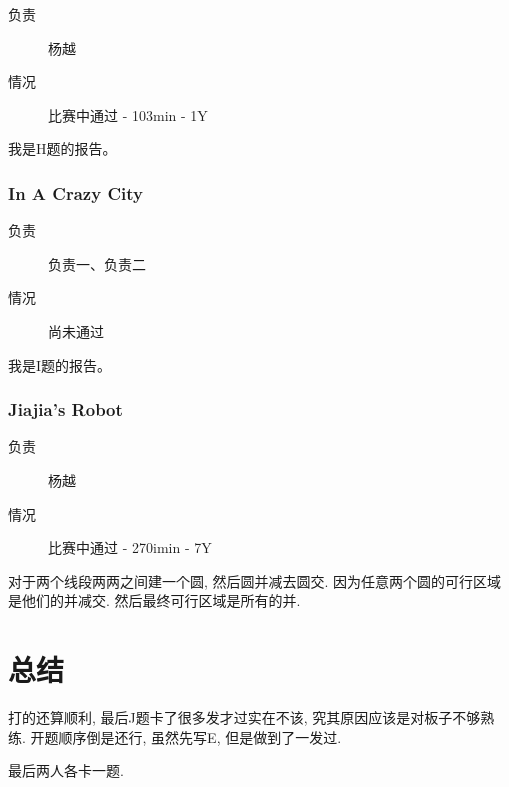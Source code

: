 \documentclass[a4paper, 11pt, nofonts, nocap, fancyhdr]{ctexart}
\newcommand{\problem}[1]{\subsubsection{#1}}
\begin{document}
\begin{description}
\item[负责] 杨越
\item[情况] 比赛中通过 - 103min - 1Y
\end{description}

我是H题的报告。

\problem{In A Crazy City}

\begin{description}
\item[负责] 负责一、负责二
\item[情况] 尚未通过
\end{description}

我是I题的报告。

\problem{Jiajia's Robot}

\begin{description}
\item[负责] 杨越
\item[情况] 比赛中通过 - 270imin - 7Y
\end{description}

对于两个线段两两之间建一个圆, 然后圆并减去圆交. 因为任意两个圆的可行区域是他们的并减交. 然后最终可行区域是所有的并. 

\section{总结}

打的还算顺利, 最后J题卡了很多发才过实在不该, 究其原因应该是对板子不够熟练. 开题顺序倒是还行, 虽然先写E, 但是做到了一发过. 

最后两人各卡一题.
\end{document}
